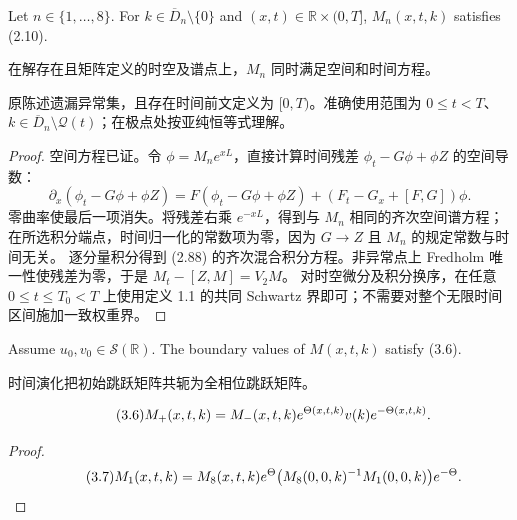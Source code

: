 \begin{paperlemmaen}
Let $n\in\{1,\ldots,8\}$. For $k\in\overline D_n\setminus\{0\}$ and $(x,t)\in\mathbb R\times(0,T]$, $M_n(x,t,k)$ satisfies (2.10).
\end{paperlemmaen}
\begin{paperlemmacn*}
在解存在且矩阵定义的时空及谱点上，$M_n$ 同时满足空间和时间方程。
\end{paperlemmacn*}
\begin{note}
原陈述遗漏异常集，且存在时间前文定义为 $[0,T)$。准确使用范围为 $0\leq t<T$、$k\in\overline D_n\setminus\mathcal Q(t)$；在极点处按亚纯恒等式理解。
\end{note}
\begin{proof}
空间方程已证。令 $\phi=M_ne^{xL}$，直接计算时间残差 $\phi_t-G\phi+\phi Z$ 的空间导数：
\[
\partial_x(\phi_t-G\phi+\phi Z)
=F(\phi_t-G\phi+\phi Z)+(F_t-G_x+[F,G])\phi.
\]
零曲率使最后一项消失。将残差右乘 $e^{-xL}$，得到与 $M_n$ 相同的齐次空间谱方程；在所选积分端点，时间归一化的常数项为零，因为 $G\to Z$ 且 $M_n$ 的规定常数与时间无关。
逐分量积分得到 (2.88) 的齐次混合积分方程。非异常点上 Fredholm 唯一性使残差为零，于是 $M_t-[Z,M]=V_2M$。
对时空微分及积分换序，在任意 $0\leq t\leq T_0<T$ 上使用定义 1.1 的共同 Schwartz 界即可；不需要对整个无限时间区间施加一致权重界。
\end{proof}
\begin{paperlemmaen}
Assume $u_0,v_0\in\mathcal S(\mathbb R)$. The boundary values of $M(x,t,k)$ satisfy (3.6).
\end{paperlemmaen}
\begin{paperlemmacn*}
时间演化把初始跳跃矩阵共轭为全相位跳跃矩阵。
\end{paperlemmacn*}
\begin{equation}\originaleq{3.6}
M_+(x,t,k)=M_-(x,t,k)e^{\Theta(x,t,k)}v(k)e^{-\Theta(x,t,k)}.
\end{equation}
\begin{proof}
\begin{equation}\originaleq{3.7}
M_1(x,t,k)=M_8(x,t,k)e^\Theta\bigl(M_8(0,0,k)^{-1}M_1(0,0,k)\bigr)e^{-\Theta}.
\end{equation}
\end{proof}
